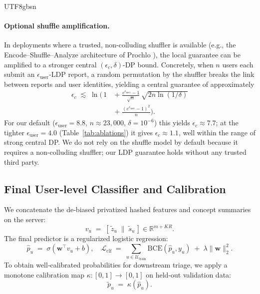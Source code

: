 \documentclass[lettersize,journal]{IEEEtran}
\begin{document}
\begin{CJK*}{UTF8}{gbsn}
\paragraph{Optional shuffle amplification.}
In deployments where a trusted, non-colluding shuffler is available (e.g., the Encode--Shuffle--Analyze architecture of Prochlo \cite{bittau2017prochlo}), the local guarantee can be amplified to a stronger central $(\epsilon_c, \delta)$-DP bound. Concretely, when $n$ users each submit an $\epsilon_{\text{user}}$-LDP report, a random permutation by the shuffler breaks the link between reports and user identities, yielding a central guarantee of approximately \cite{balle2019shuffle,erlingsson2019shuffle}
\begin{equation}
\begin{aligned}
  \epsilon_c \;\lesssim\;
  \ln\!\Biggl(\,1
    \;&+\; \frac{e^{\epsilon_{\text{user}}}-1}{\sqrt{n}}\,\sqrt{2n\ln(1/\delta)}\\[0.2ex]
    \;&+\; \frac{(e^{\epsilon_{\text{user}}}-1)^2}{n}\Biggr).
\end{aligned}
\end{equation}
For our default ($\epsilon_{\text{user}}{=}8.8$, $n{\approx}23{,}000$, $\delta{=}10^{-6}$) this yields $\epsilon_c \approx 7.7$; at the tighter $\epsilon_{\text{user}}{=}4.0$ (Table~\ref{tab:ablations}) it gives $\epsilon_c \approx 1.1$, well within the range of strong central DP. We do not rely on the shuffle model by default because it requires a non-colluding shuffler; our LDP guarantee holds without any trusted third party.

\subsection{Final User‑level Classifier and Calibration}
We concatenate the de‑biased privatized hashed features and concept summaries on the server:
\begin{equation}
    v_u \;=\; \left[\, \tilde{z}_u \;\|\; \tilde{s}_u \,\right] \in \mathbb{R}^{m + K R}.
\end{equation}
The final predictor is a regularized logistic regression:
\begin{equation}
    \hat{p}_u \;=\; \sigma(\mathbf{w}^\top v_u + b), \quad
    \mathcal{L}_{\text{clf}} 
    \;=\; \sum_{u \in \mathcal{U}_{\text{train}}}
    \mathrm{BCE}(\hat{p}_u, y_u) \;+\; \lambda \lVert \mathbf{w} \rVert_2^2.
\end{equation}
To obtain well‑calibrated probabilities for downstream triage, we apply a monotone calibration map $\kappa:[0,1]\to[0,1]$ on held‑out validation data:
\begin{equation}
    \tilde{p}_u \;=\; \kappa(\hat{p}_u).
\end{equation}

\end{CJK*}
\end{document}
